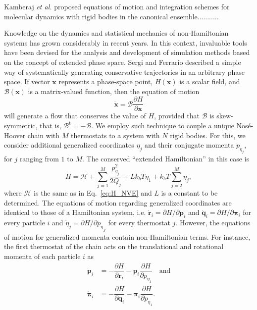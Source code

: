 \documentclass[aip,jcp,reprint,amsmath,amssymb]{revtex4-1}
\newcommand{\vt}[1]{\boldsymbol{\mathbf{#1}}}           %
\newcommand{\tr}[1]{#1^\text{t}}                               %
\newcommand{\diff}[2]{\dfrac{\partial #1}{\partial #2}} %
\begin{document}
Kamberaj \textit{et al.}\cite{Kamberaj2005} proposed equations of motion and integration schemes for molecular dynamics with rigid bodies in the canonical ensemble...........

Knowledge on the dynamics and statistical mechanics of non-Hamiltonian systems has grown considerably in recent years.\cite{Tuckerman_1999, Tuckerman2001, Sergi2001, Sergi2003, Ezra2004, Sergi2004, Ezra2006, Sergi2010b} In this context, invaluable tools have been devised for the analysis and development of simulation methods based on the concept of extended phase space. Sergi and Ferrario\cite{Sergi2001} described a simple way of systematically generating conservative trajectories in an arbitrary phase space. If vector $\vt x$ represents a phase-space point, $H(\vt x)$ is a scalar field, and $\boldsymbol{\mathcal B}(\vt x)$ is a matrix-valued function, then the equation of motion
\begin{equation} \label{eq:eq_of_motion}
\dot{\vt x} = \boldsymbol{\mathcal B}\diff{H}{\vt x}
\end{equation}
will generate a flow that conserves the value of $H$, provided that $\boldsymbol{\mathcal B}$ is skew-symmetric, that is, $\tr{ \boldsymbol{ \mathcal B }} = -\boldsymbol{ \mathcal B }$. We employ such technique to couple a unique Nos\'{e}-Hoover chain\cite{Martyna1992} with $M$ thermostats to a system with $N$ rigid bodies. For this, we consider additional generalized coordinates $\eta_j$ and their conjugate momenta $p_{\eta_j}$, for $j$ ranging from $1$ to $M$. The conserved ``extended Hamiltonian'' in this case is
\begin{equation}
\label{eq:H_nvt}
H = \mathcal{H} + \sum_{j=1}^{M}\frac{p_{\eta_j}^2}{2Q_j} + L k_bT\eta_1 + k_bT\sum_{j=2}^M \eta_j,
\end{equation}
where $\mathcal H$ is the same as in Eq.~\ref{eq:H_NVE} and $L$ is a constant to be determined. The equations of motion regarding generalized coordinates are identical to those of a Hamiltonian system, i.e. $\dot{\vt r}_i = {\partial H}/{\partial \vt p_i}$ and $\dot{\vt q}_i = {\partial H}/{\partial \vt \pi_i}$ for every particle $i$ and $\dot{\eta}_j = {\partial H}/{\partial {p_\eta}_j}$ for every thermostat $j$. However, the equations of motion for generalized momenta contain non-Hamiltonian terms. For instance, the first thermostat of the chain acts on the translational and rotational momenta of each particle $i$ as
\[
\begin{split}
\dot{\vt p}_i &= -\diff{H}{\vt r_i} - {\vt p}_i \diff{H}{p_{\eta_1}} \quad \text{and} \\
\dot{\vt \pi}_i &= -\diff{H}{\vt q_i} - {\vt \pi}_i \diff{H}{p_{\eta_1}}.
\end{split}
\]
\end{document}
